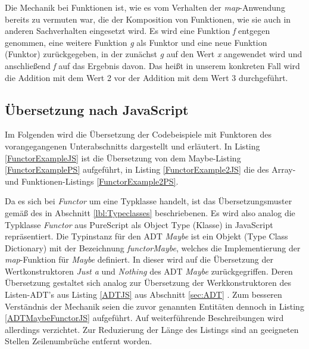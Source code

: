 \documentclass[
12pt,
ngerman,
oneside]
{scrbook} %
\begin{document}
Die Mechanik bei Funktionen ist, wie es vom Verhalten der \emph{map}-Anwendung bereits zu vermuten war, die der Komposition von Funktionen, wie sie auch in anderen Sachverhalten eingesetzt wird. Es wird eine Funktion \emph{f} entgegen genommen, eine weitere Funktion \emph{g} als Funktor und eine neue Funktion (Funktor) zurückgegeben, in der zunächst \emph{g} auf den Wert \emph{x} angewendet wird und anschließend \emph{f} auf das Ergebnis davon. Das heißt in unserem konkreten Fall wird die Addition mit dem Wert 2 vor der Addition mit dem Wert 3 durchgeführt.

\subsection{Übersetzung nach JavaScript}
Im Folgenden wird die Übersetzung der Codebeispiele mit Funktoren des vorangegangenen Unterabschnitts dargestellt und erläutert. In Listing \ref{FunctorExampleJS} ist die Übersetzung von dem Maybe-Listing \ref{FunctorExamplePS} aufgeführt, in Listing \ref{FunctorExample2JS} die des Array- und Funktionen-Listings \ref{FunctorExample2PS}.

Da es sich bei \emph{Functor} um eine Typklasse handelt, ist das Übersetzungsmuster gemäß des in Abschnitt \glqq \ref{lbl:Typeclasses} \grqq{} beschriebenen. Es wird also analog die Typklasse \emph{Functor} aus PureScript als Object Type (Klasse) in JavaScript repräsentiert. Die Typinstanz für den ADT \emph{Maybe} ist ein Objekt (Type Class Dictionary) mit der Bezeichnung \emph{functorMaybe}, welches die Implementierung der \emph{map}-Funktion für \emph{Maybe} definiert.  In dieser wird auf die Übersetzung der Wertkonstruktoren \emph{Just a} und \emph{Nothing} des ADT \emph{Maybe} zurückgegriffen. Deren Übersetzung gestaltet sich analog zur Übersetzung der Werkkonstruktoren des Listen-ADT's aus Listing \ref{ADTJS} aus Abschnitt \glqq \ref{sec:ADT} \grqq{}. Zum besseren Verständnis der Mechanik seien die zuvor genannten Entitäten dennoch in Listing \ref{ADTMaybeFunctorJS} aufgeführt. Auf weiterführende Beschreibungen wird allerdings verzichtet. Zur Reduzierung der Länge des Listings sind an geeigneten Stellen Zeilenumbrüche entfernt worden.
\end{document}

